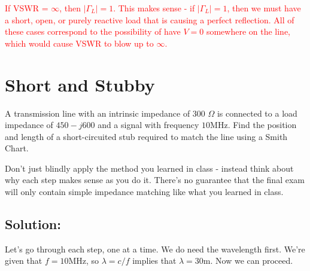 \documentclass{article}
\begin{document}
\textcolor{red}{If VSWR = $\infty$, then $\vert \Gamma_L \vert = 1$. This makes sense - if $\vert \Gamma_L \vert = 1$, then we must have a short, open, or purely reactive load that is causing a perfect reflection. All of these cases correspond to the possibility of have $V = 0$ somewhere on the line, which would cause VSWR to blow up to $\infty$.}

\vfill
\newpage

\section{Short and Stubby}

A transmission line with an intrinsic impedance of 300 $\Omega$ is connected to a load impedance of $450-j600$ and a signal with frequency $10$MHz. Find the position and length of a short-circuited stub required to match the line using a Smith Chart.

Don't just blindly apply the method you learned in class - instead think about why each step makes sense as you do it. There's no guarantee that the final exam will only contain simple impedance matching like what you learned in class.

\subsection{Solution:}

Let's go through each step, one at a time. We do need the wavelength first. We're given that $f = 10$MHz, so $\lambda = c/f$ implies that $\lambda = 30$m. Now we can proceed.
\end{document}
